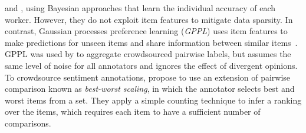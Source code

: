 and \citet{wang2016blind},
using Bayesian approaches that learn the individual accuracy of each worker.
However, they do not %
exploit item features to mitigate data sparsity.
In contrast, Gaussian processes preference learning (\emph{GPPL})
uses item features to make predictions for unseen items and
share information between similar items~\citep{chu2005preference}.
GPPL was used by \citet{simpson2018finding} to aggregate crowdsourced pairwise labels,
but assumes the same level of noise for all annotators and ignores the effect of divergent opinions.
To crowdsource sentiment annotations, 
\citet{kiritchenko2016capturing} propose to use an extension of pairwise comparison
known as \emph{best-worst scaling}, in which the annotator selects best and worst items from a set.
They apply a simple counting technique to infer a ranking over the items, which requires 
each item to have a sufficient number of comparisons.


